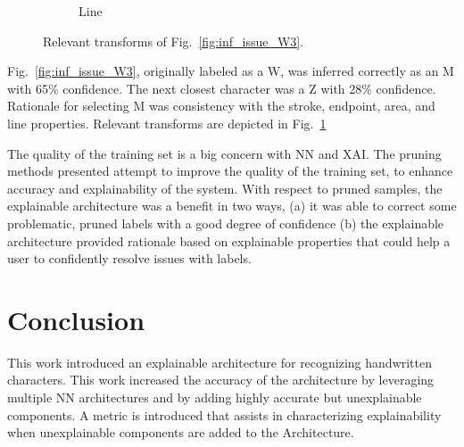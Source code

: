 \documentclass[conference]{IEEEtran}
\begin{document}
\begin{figure}[h]
\begin{subfigure}{.20\columnwidth}
        \caption{Line}
    \end{subfigure}%
    \caption{Relevant transforms of Fig.~\ref{fig:inf_issue_W3}.}
    \label{fig:w3_trans}
\end{figure}

Fig.~\ref{fig:inf_issue_W3}, originally labeled as a W, was inferred correctly
as an M with 65\% confidence. The next closest character was a Z with 28\%
confidence.  Rationale for selecting M was consistency with the stroke,
endpoint, area, and line properties.  Relevant transforms are depicted in
Fig.~\ref{fig:w3_trans}


The quality of the training set is a big concern with NN and XAI.  The pruning
methods presented attempt to improve the quality of the training set, to enhance
accuracy and explainability of the system. With respect to pruned samples, the
explainable architecture was a benefit in two ways, (a) it was able to correct
some problematic, pruned labels with a good degree of confidence (b) the
explainable architecture provided rationale based on explainable properties that
could help a user to confidently resolve issues with labels.

\section{Conclusion}
\label{conclusion}






This work introduced an explainable architecture for recognizing handwritten
characters.  This work increased the accuracy of the architecture by leveraging
multiple NN architectures and by adding highly accurate but unexplainable
components. A metric is introduced that assists in characterizing explainability
when unexplainable components are added to the Architecture.
\end{document}

